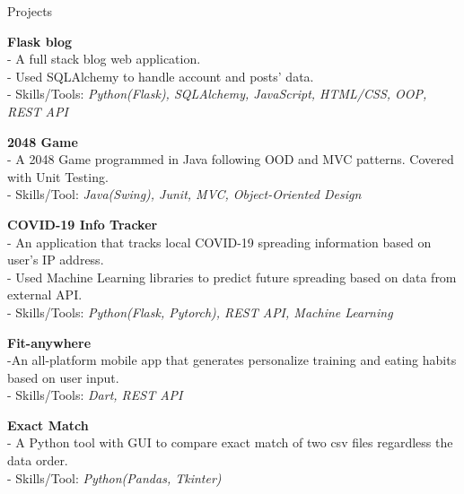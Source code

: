 \documentclass{resume} %
\begin{document}
\begin{rSection}{Projects}

{\bf Flask blog}
\\- A full stack blog web application.
\\- Used SQLAlchemy to handle account and posts' data.
\\- Skills/Tools: \emph{Python(Flask), SQLAlchemy, JavaScript, HTML/CSS, OOP, REST API}

{\bf 2048 Game}
\\- A 2048 Game programmed in Java following OOD and MVC patterns. Covered with Unit Testing.
\\- Skills/Tool: \emph{Java(Swing), Junit, MVC, Object-Oriented Design}

{\bf COVID-19 Info Tracker}
\\- An application that tracks local COVID-19 spreading information based on user's IP address.
\\- Used Machine Learning libraries to predict future spreading based on data from external API.
\\- Skills/Tools: \emph{Python(Flask, Pytorch), REST API, Machine Learning}

{\bf Fit-anywhere}
\\-An all-platform mobile app that generates personalize training and eating habits based on user input.
\\- Skills/Tools: \emph{Dart, REST API}


{\bf Exact Match}
\\- A Python tool with GUI to compare exact match of two csv files regardless the data order.
\\- Skills/Tool: \emph{Python(Pandas, Tkinter)}

\end{rSection}

\end{document}

